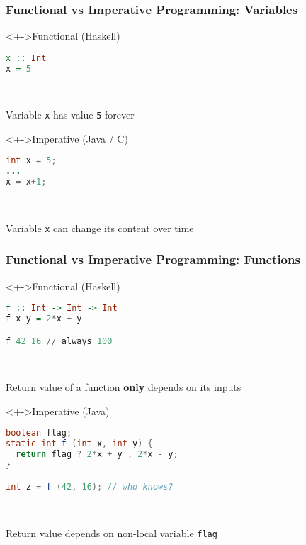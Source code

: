 \documentclass{beamer}
\begin{document}
\begin{frame}[fragile]
  \frametitle{Functional vs Imperative Programming: Variables}
  \begin{block}<+->{Functional (Haskell)}
    \begin{minipage}[t]{0.45\linewidth}
\begin{lstlisting}[language=Haskell]
x :: Int
x = 5
\end{lstlisting}
    \end{minipage}
    ~
    \begin{minipage}[t]{0.45\linewidth}
      Variable \texttt{x} has value \texttt{5} forever
    \end{minipage}
  \end{block}
  \begin{block}<+->{Imperative (Java / C)}
    \begin{minipage}[t]{0.45\linewidth}
\begin{lstlisting}[language=Java]
int x = 5;
...
x = x+1;
\end{lstlisting}
    \end{minipage}
    ~
    \begin{minipage}[t]{0.45\linewidth}
      Variable \texttt{x} can change its content over time
    \end{minipage}
  \end{block}
\end{frame}

\begin{frame}[fragile]
  \frametitle{Functional vs Imperative Programming: Functions}
  \begin{block}<+->{Functional (Haskell)}
    \begin{minipage}[t]{0.45\linewidth}
\begin{lstlisting}[language=Haskell]
f :: Int -> Int -> Int
f x y = 2*x + y

f 42 16 // always 100
\end{lstlisting}
    \end{minipage}
    ~
    \begin{minipage}[t]{0.45\linewidth}
      Return value of a function \textbf{only} depends on its inputs
    \end{minipage}
  \end{block}
  \begin{block}<+->{Imperative (Java)}
    \begin{minipage}[t]{0.45\linewidth}
\begin{lstlisting}[language=Java]
boolean flag;
static int f (int x, int y) {
  return flag ? 2*x + y , 2*x - y;
}

int z = f (42, 16); // who knows?
\end{lstlisting}
    \end{minipage}
    ~
    \begin{minipage}[t]{0.45\linewidth}
      Return value depends on non-local variable \texttt{flag}
    \end{minipage}
  \end{block}
\end{frame}
\end{document}
